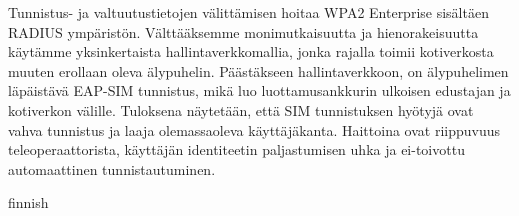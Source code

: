 \documentclass[12pt,a4paper,english]{tutthesis}
\begin{document}
\begin{otherlanguage}{finnish}
Tunnistus- ja valtuutustietojen välittämisen hoitaa WPA2 Enterprise sisältäen RADIUS ympäristön. Välttääksemme monimutkaisuutta ja hienorakeisuutta käytämme yksinkertaista hallintaverkkomallia, jonka rajalla toimii kotiverkosta muuten
erollaan oleva älypuhelin.
Päästäkseen hallintaverkkoon, on älypuhelimen läpäistävä EAP-SIM tunnistus, mikä luo luottamusankkurin ulkoisen edustajan ja kotiverkon välille.
Tuloksena näytetään, että SIM tunnistuksen hyötyjä ovat vahva tunnistus ja laaja olemassaoleva käyttäjäkanta. Haittoina ovat riippuvuus teleoperaattorista, käyttäjän identiteetin
paljastumisen uhka ja ei-toivottu automaattinen tunnistautuminen.
\end{otherlanguage}{finnish} %

\end{document}
